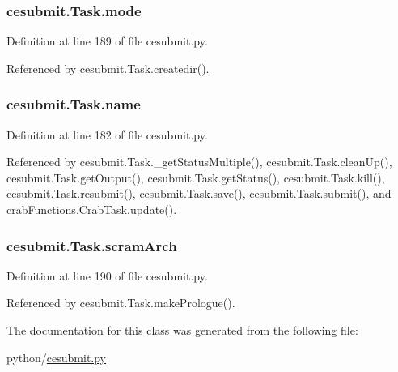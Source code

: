 \subsubsection[{mode}]{\setlength{\rightskip}{0pt plus 5cm}cesubmit.\-Task.\-mode}\label{classcesubmit_1_1Task_a19285f65074058f8dcd56a7b3feb9e20}


Definition at line 189 of file cesubmit.\-py.



Referenced by cesubmit.\-Task.\-createdir().

\subsubsection[{name}]{\setlength{\rightskip}{0pt plus 5cm}cesubmit.\-Task.\-name}\label{classcesubmit_1_1Task_a05a05a652fe678e897ec90fb3c9a4da6}


Definition at line 182 of file cesubmit.\-py.



Referenced by cesubmit.\-Task.\-\_\-get\-Status\-Multiple(), cesubmit.\-Task.\-clean\-Up(), cesubmit.\-Task.\-get\-Output(), cesubmit.\-Task.\-get\-Status(), cesubmit.\-Task.\-kill(), cesubmit.\-Task.\-resubmit(), cesubmit.\-Task.\-save(), cesubmit.\-Task.\-submit(), and crab\-Functions.\-Crab\-Task.\-update().

\subsubsection[{scram\-Arch}]{\setlength{\rightskip}{0pt plus 5cm}cesubmit.\-Task.\-scram\-Arch}\label{classcesubmit_1_1Task_a56c50586fa3366ae571fce3dd62d84a8}


Definition at line 190 of file cesubmit.\-py.



Referenced by cesubmit.\-Task.\-make\-Prologue().



The documentation for this class was generated from the following file\-:\begin{DoxyCompactItemize}
\item 
python/\hyperlink{cesubmit_8py}{cesubmit.\-py}\end{DoxyCompactItemize}
